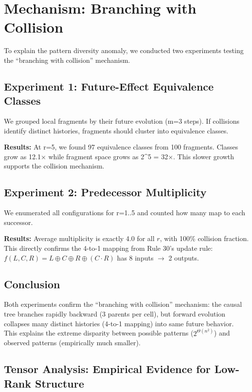 \documentclass[11pt]{article}
\begin{document}
\section{Mechanism: Branching with Collision}
\label{sec:mechanism}

To explain the pattern diversity anomaly, we conducted two experiments testing the ``branching with collision'' mechanism.

\subsection{Experiment 1: Future-Effect Equivalence Classes}

We grouped local fragments by their future evolution (m=3 steps). If collisions identify distinct histories, fragments should cluster into equivalence classes.

\textbf{Results:} At r=5, we found 97 equivalence classes from 100 fragments. Classes grow as 12.1× while fragment space grows as 2^5 = 32×. This slower growth supports the collision mechanism.

\subsection{Experiment 2: Predecessor Multiplicity}

We enumerated all configurations for r=1..5 and counted how many map to each successor.

\textbf{Results:} Average multiplicity is exactly 4.0 for all $r$, with 100\% collision fraction. This directly confirms the 4-to-1 mapping from Rule 30's update rule: $f(L,C,R) = L \oplus C \oplus R \oplus (C \cdot R)$ has 8 inputs $\to$ 2 outputs.

\subsection{Conclusion}

Both experiments confirm the ``branching with collision'' mechanism: the causal tree branches rapidly backward (3 parents per cell), but forward evolution collapses many distinct histories (4-to-1 mapping) into same future behavior. This explains the extreme disparity between possible patterns ($2^{\Theta(n^2)}$) and observed patterns (empirically much smaller).

\subsection{Tensor Analysis: Empirical Evidence for Low-Rank Structure}
\end{document}
